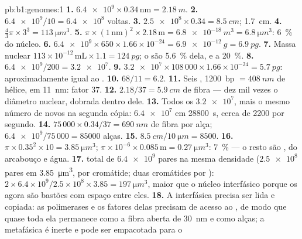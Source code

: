 \begin{solution}{pb:b1:genomes:1}
\textbf{1.} $\num{6.4e9}\times 0.34\,\mathrm{nm} = \qty{2.18}{m}$.
\textbf{2.} $\num{6.4e9}/10 = \num{6.4e8}$ voltas.
\textbf{3.} $\num{2.5e8}\times 0.34 = \qty{8.5}{cm}$; \qty{1.7}{cm}.
\textbf{4.} $\frac{4}{3}\pi\times 3^3 = \qty{113}{\micro m^3}$.
\textbf{5.} $\pi\times(1\,\mathrm{nm})^2\times 2.18\,\mathrm{m} =
\qty{6.8e-18}{m^3} = \qty{6.8}{\micro m^3}$: \qty{6}{\%} do núcleo.
\textbf{6.} $\num{6.4e9}\times 650\times 1.66\times 10^{-24} =
\qty{6.9e-12}{g} = \qty{6.9}{pg}$.
\textbf{7.} Massa nuclear $113\times 10^{-12}\,\mathrm{mL}\times 1.1 =
\qty{124}{pg}$; o  são \qty{5.6}{\%} dela, e a  \qty{20}{\%}.
\textbf{8.} $\num{6.4e9}/200 = \num{3.2e7}$.
\textbf{9.} $\num{3.2e7}\times 108\,000\times 1.66\times 10^{-24} =
\qty{5.7}{pg}$: aproximadamente igual ao .
\textbf{10.} $68/11 = 6.2$.
\textbf{11.} Seis , \qty{1200}{bp} $= \qty{408}{nm}$ de
hélice, em \qty{11}{nm}: fator $37$.
\textbf{12.} $2.18/37 = \qty{5.9}{cm}$ de fibra --- dez mil vezes o
diâmetro nuclear, dobrada dentro dele.
\textbf{13.} Todos os $\num{3.2e7}$, mais o mesmo número de novos na
segunda cópia: $\num{6.4e7}$ em \qty{28800}{s}, cerca de \num{2200} por
segundo.
\textbf{14.} $75\,000\times 0.34/37 = \qty{690}{nm}$ de fibra por alça;
$\num{6.4e9}/75\,000 = \num{85000}$ alças.
\textbf{15.} $\qty{8.5}{cm}/\qty{10}{\micro m} = 8500$.
\textbf{16.} $\pi\times 0.35^2\times 10 = \qty{3.85}{\micro m^3}$; 
$\pi\times 10^{-6}\times 0.085\,\mathrm{m} = \qty{0.27}{\micro m^3}$:
\qty{7}{\%} --- o resto são ,  do arcabouço e água.
\textbf{17.}  total de $\num{6.4e9}$ pares na mesma densidade
($\num{2.5e8}$ pares em \qty{3.85}{\micro m^3}, por cromátide; duas
cromátides por ): $2\times 6.4\times 10^9/2.5\times 10^8\times
3.85 = \qty{197}{\micro m^3}$, maior que o núcleo interfásico porque os
 agora são bastões com espaço entre eles.
\textbf{18.} A  interfásica precisa ser lida e copiada: as
polimerases e os fatores delas precisam de acesso ao , de modo que
quase toda ela permanece como a fibra aberta de \qty{30}{nm} e como
alças; a  metafásica é inerte e pode ser empacotada para o

\end{solution}
